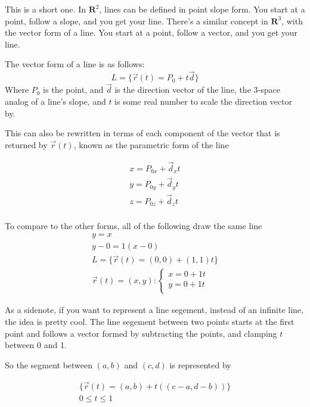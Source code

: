 \documentclass[12pt, letterpaper]{article}
\begin{document}
This is a short one. In $\mathbf{R}^2$, lines can be defined in point slope form. You start at a point, follow a slope, and you get your line. 
There's a similar concept in $\mathbf{R}^3$, with the vector form of a line. You start at a point, follow a vector, and you get your line.

The vector form of a line is as follows:
\begin{displaymath}
    L = \{\vec{r}(t) = P_0 + t\vec{d}\}
\end{displaymath}
Where $P_0$ is the point, and $\vec{d}$ is the direction vector of the line, the 3-space analog of a line's slope, and $t$ is some real number to scale the direction vector by.

This can also be rewritten in terms of each component of the vector that is returned by $\vec{r}(t)$, known as the parametric form of the line

\begin{gather*}
    x = P_{0x} + \vec{d}_xt\\
    y = P_{0y} + \vec{d}_yt\\
    z = P_{0z} + \vec{d}_zt\\
\end{gather*}


To compare to the other forms, all of the following draw the same line
\begin{gather*}
    y = x \\
    y - 0 = 1 (x - 0)\\
    L = \{\vec{r}(t) = (0, 0) + (1, 1)t\}\\
    \vec{r}(t)= (x, y): 
    \begin{cases}
        x = 0 + 1t\\
        y = 0 + 1t\\
    \end{cases}
\end{gather*}

As a sidenote, if you want to represent a line segement, instead of an infinite line, the idea is pretty cool. The line segement between two points starts at the first point and follows a vector formed by subtracting the points, and clamping $t$ between 0 and 1.

So the segment between $(a, b)$ and $(c, d)$ is represented by

\begin{gather*}
    \{\vec{r}(t) = (a,b) + t\left((c - a, d - b)\right)\}\\
    0 \leq t \leq 1
\end{gather*}
\end{document}
